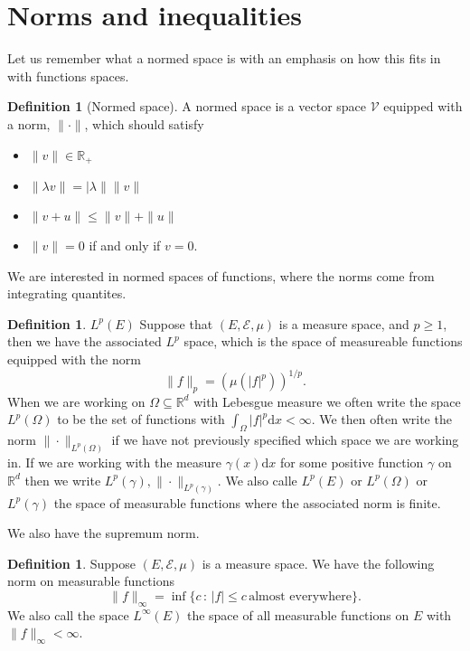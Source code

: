 \documentclass[11pt]{article}
\theoremstyle{definition}
\newtheorem{dfn}[thm]{Definition}
\theoremstyle{remark}
\begin{document}
\section{Norms and inequalities}
Let us remember what a normed space is with an emphasis on how this fits in with functions spaces.
\begin{dfn}[Normed space]
A normed space is a vector space $\mathcal{V}$ equipped with a norm, $\|\cdot\|$, which should satisfy
\begin{itemize}
\item $\| v\| \in \mathbb{R}_+$
\item $\| \lambda v\| = |\lambda\| \|v\|$
\item $\|v+u\| \leq \|v\| + \|u\|$
\item $\|v\|=0$ if and only if $v=0$.
\end{itemize}
\end{dfn}
We are interested in normed spaces of functions, where the norms come from integrating quantites. 

\begin{dfn}{$L^p(E)$}
Suppose that $(E, \mathcal{E}, \mu)$ is a measure space, and $p \geq 1$, then we have the associated $L^p$ space, which is the space of measureable functions equipped with the norm
\[ \| f\|_p = \left( \mu(|f|^p)\right)^{1/p}. \] When we are working on $\Omega \subseteq \mathbb{R}^d$ with Lebesgue measure we often write the space $L^p(\Omega)$ to be the set of functions with $ \int_\Omega |f|^p \mathrm{d}x < \infty$. We then often write the norm $\| \cdot\|_{L^p(\Omega)}$ if we have not previously specified which space we are working in. If we are working with the measure $\gamma(x) \mathrm{d}x$ for some positive function $\gamma$ on $\mathbb{R}^d$ then we write $L^p(\gamma), \| \cdot\|_{L^p(\gamma)}$.  We also calle $L^p(E)$ or $L^p(\Omega)$ or $L^p(\gamma)$ the space of measurable functions where the associated norm is finite.
\end{dfn}

We also have the supremum norm.

\begin{dfn}
Suppose $(E, \mathcal{E}, \mu)$ is a measure space. We have the following norm on measurable functions
\[ \|f\|_\infty = \inf \{ c \,:\, |f| \leq c \, \mbox{almost everywhere}\}. \] We also call the space $L^\infty(E)$ the space of all measurable functions on $E$ with $\|f\|_\infty < \infty$.
\end{dfn}
\end{document}
